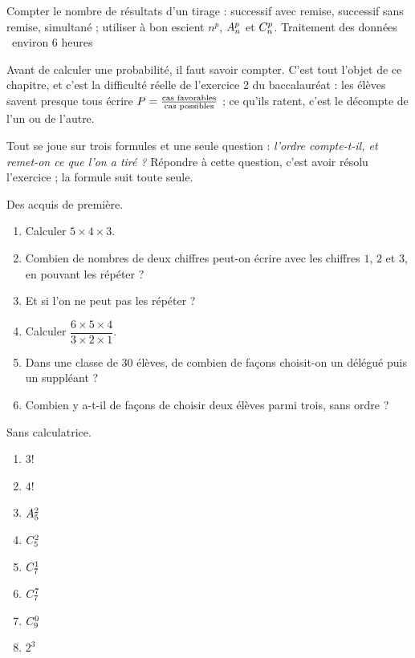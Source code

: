   {Compter le nombre de résultats d'un tirage : successif avec remise,
   successif sans remise, simultané ; utiliser à bon escient $n^{p}$,
   $\arrang{p}{n}$ et $\combi{p}{n}$.}
  {Traitement des données \textbullet\ environ 6 heures}

Avant de calculer une probabilité, il faut savoir compter. C'est tout l'objet
de ce chapitre, et c'est la difficulté réelle de l'exercice 2 du
baccalauréat : les élèves savent presque tous écrire
$\Prob = \frac{\text{cas favorables}}{\text{cas possibles}}$ ; ce qu'ils
ratent, c'est le décompte de l'un ou de l'autre.

Tout se joue sur trois formules et une seule question : \emph{l'ordre
compte-t-il, et remet-on ce que l'on a tiré ?} Répondre à cette question,
c'est avoir résolu l'exercice ; la formule suit toute seule.

\begin{revision}
Des acquis de première.

\begin{enumerate}[label=\textbf{\arabic*.}, leftmargin=*, itemsep=0.35em]
  \item Calculer $5\times4\times3$.
  \item Combien de nombres de deux chiffres peut-on écrire avec les
        chiffres $1$, $2$ et $3$, en pouvant les répéter ?
  \item Et si l'on ne peut pas les répéter ?
  \item Calculer $\dfrac{6\times5\times4}{3\times2\times1}$.
  \item Dans une classe de $30$ élèves, de combien de façons choisit-on un
        délégué puis un suppléant ?
  \item Combien y a-t-il de façons de choisir deux élèves parmi trois, sans
        ordre ?
\end{enumerate}
\end{revision}

\begin{automatismes}
Sans calculatrice.

\begin{enumerate}[label=\textbf{\alph*)}, leftmargin=*, itemsep=0.25em]
  \item $3!$
  \item $4!$
  \item $\arrang{2}{5}$
  \item $\combi{2}{5}$
  \item $\combi{1}{7}$
  \item $\combi{7}{7}$
  \item $\combi{0}{9}$
  \item $2^{3}$
\end{enumerate}
\end{automatismes}

